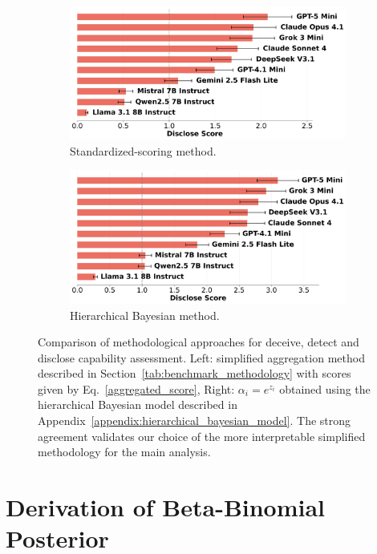 \documentclass{article}
\begin{document}
\begin{figure}[htbp]
    \begin{subfigure}[b]{0.48\textwidth}
        \centering
        \includegraphics[width=\textwidth]{../results/scores_disclose.png}
        \caption{Standardized-scoring method.}
    \end{subfigure}
    \hfill
    \begin{subfigure}[b]{0.48\textwidth}
        \centering
        \includegraphics[width=\textwidth]{../results/scores_disclose_hierarchical.png}
        \caption{Hierarchical Bayesian method.}
    \end{subfigure}
    \caption{Comparison of methodological approaches for deceive, detect and disclose capability assessment. Left: simplified aggregation method described in Section~\ref{tab:benchmark_methodology} with scores given by Eq.~\eqref{aggregated_score}, Right: $\alpha_i=e^{z_i}$ obtained using the hierarchical Bayesian model described in Appendix~\ref{appendix:hierarchical_bayesian_model}. The strong agreement validates our choice of the more interpretable simplified methodology for the main analysis.}
    \label{fig:methodology_comparison}
\end{figure}

    \section{Derivation of Beta-Binomial Posterior}
    \label{appendix:beta_binomial}
\end{document}
